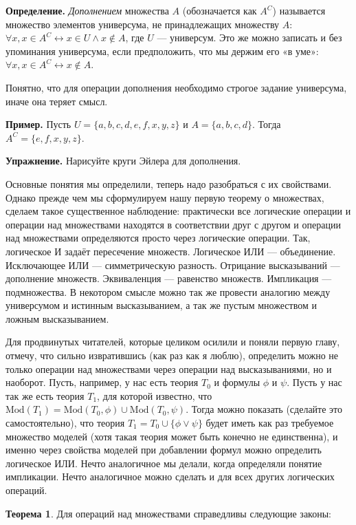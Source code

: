 {\bfseries Определение.} {\slshape Дополнением} множества $A$ (обозначается как $A^C$) называется множество элементов универсума, не принадлежащих множеству $A$: $\forall x, x\in A^C \leftrightarrow x\in U \wedge x \not \in A$, где $U$ — универсум. Это же можно записать и без упоминания универсума, если предположить, что мы держим его «в уме»: $\forall x, x\in A^C \leftrightarrow x\not \in A$.

Понятно, что для операции дополнения необходимо строгое задание универсума, иначе она теряет смысл.

{\bfseries Пример.} Пусть $U = \{a, b, c, d, e, f, x, y, z\}$ и $A = \{a, b, c, d\}$. Тогда $A^C = \{e, f, x, y, z\}$.

{\bfseries Упражнение.} Нарисуйте круги Эйлера для дополнения.

Основные понятия мы определили, теперь надо разобраться с их свойствами. Однако прежде чем мы сформулируем нашу первую теорему о множествах, сделаем такое существенное наблюдение: практически все логические операции и операции над множествами находятся в соответствии друг с другом и операции над множествами определяются просто через логические операции. Так, логическое И задаёт пересечение множеств. Логическое ИЛИ — объединение. Исключающее ИЛИ — симметрическую разность. Отрицание высказываний — дополнение множеств. Эквиваленция — равенство множеств. Импликация — подмножества. В некотором смысле можно так же провести аналогию между универсумом и истинным высказыванием, а так же пустым множеством и ложным высказыванием.

Для продвинутых читателей, которые целиком осилили и поняли первую главу, отмечу, что сильно извратившись (как раз как я люблю), определить можно не только операции над множествами через операции над высказываниями, но и наоборот. Пусть, например, у нас есть теория $T_0$ и формулы $\phi$ и $\psi$. Пусть у нас так же есть теория $T_1$, для которой известно, что $\mathrm{Mod}(T_1) = \mathrm{Mod}(T_0, \phi) \cup \mathrm{Mod}(T_0, \psi)$. Тогда можно показать (сделайте это самостоятельно), что теория $T_1 = T_0 \cup \{\phi\vee \psi\}$ будет иметь как раз требуемое множество моделей (хотя такая теория может быть конечно не единственна), и именно через свойства моделей при добавлении формул можно определить логическое ИЛИ. Нечто аналогичное мы делали, когда определяли понятие импликации. Нечто аналогичное можно сделать и для всех других логических операций.

{\bfseries Теорема 1}. Для операций над множествами справедливы следующие законы:

